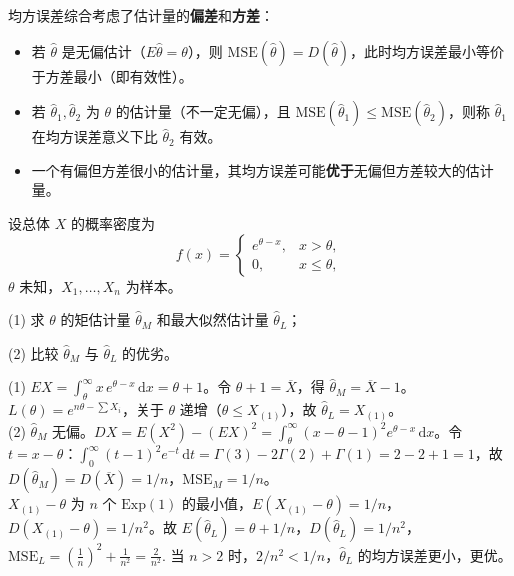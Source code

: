 \documentclass[lang=cn,11pt]{elegantbook}
\begin{document}
\begin{note}
均方误差综合考虑了估计量的\textbf{偏差}和\textbf{方差}：
\begin{itemize}
    \item 若 \(\hat{\theta}\) 是无偏估计（\(E\hat{\theta}=\theta\)），则 \(\mathrm{MSE}(\hat{\theta}) = D(\hat{\theta})\)，此时均方误差最小等价于方差最小（即有效性）。
    \item 若 \(\hat{\theta}_1, \hat{\theta}_2\) 为 \(\theta\) 的估计量（不一定无偏），且 \(\mathrm{MSE}(\hat{\theta}_1) \leq \mathrm{MSE}(\hat{\theta}_2)\)，则称 \(\hat{\theta}_1\) 在均方误差意义下比 \(\hat{\theta}_2\) 有效。
    \item 一个有偏但方差很小的估计量，其均方误差可能\textbf{优于}无偏但方差较大的估计量。
\end{itemize}
\end{note}


\begin{exercise}\label{exer:7-shifted-exp}
设总体 \(X\) 的概率密度为
\[
f(x) = \begin{cases} e^{\theta-x}, & x > \theta, \\ 0, & x \leq \theta, \end{cases}
\]
\(\theta\) 未知，\(X_1, \dots, X_n\) 为样本。\par
(1) 求 \(\theta\) 的矩估计量 \(\hat{\theta}_M\) 和最大似然估计量 \(\hat{\theta}_L\)；\par
(2) 比较 \(\hat{\theta}_M\) 与 \(\hat{\theta}_L\) 的优劣。
\end{exercise}
\begin{solution}
(1) \(EX = \displaystyle\int_\theta^\infty x\,e^{\theta-x}\,\mathrm{d}x = \theta + 1\)。令 \(\theta+1 = \overline{X}\)，得 \(\hat{\theta}_M = \overline{X}-1\)。
\(L(\theta) = e^{n\theta-\sum X_i}\)，关于 \(\theta\) 递增（\(\theta \leq X_{(1)}\)），故 \(\hat{\theta}_L = X_{(1)}\)。\\
(2) \(\hat{\theta}_M\) 无偏。\(DX = E(X^2)-(EX)^2 = \displaystyle\int_\theta^\infty(x-\theta-1)^2e^{\theta-x}\,\mathrm{d}x\)。令 \(t=x-\theta\)：\(\displaystyle\int_0^\infty(t-1)^2e^{-t}\,\mathrm{d}t = \Gamma(3)-2\Gamma(2)+\Gamma(1) = 2-2+1 = 1\)，故 \(D(\hat{\theta}_M) = D(\overline{X}) = 1/n\)，\(\mathrm{MSE}_M = 1/n\)。\\
\(X_{(1)}-\theta\) 为 \(n\) 个 \(\mathrm{Exp}(1)\) 的最小值，\(E(X_{(1)}-\theta) = 1/n\)，\(D(X_{(1)}-\theta) = 1/n^2\)。故 \(E(\hat{\theta}_L) = \theta + 1/n\)，\(D(\hat{\theta}_L) = 1/n^2\)，
\(
\mathrm{MSE}_L = \left(\frac{1}{n}\right)^{\!2} + \frac{1}{n^2} = \frac{2}{n^2}.
\)
当 \(n > 2\) 时，\(2/n^2 < 1/n\)，\(\hat{\theta}_L\) 的均方误差更小，更优。
\end{solution}
\end{document}
